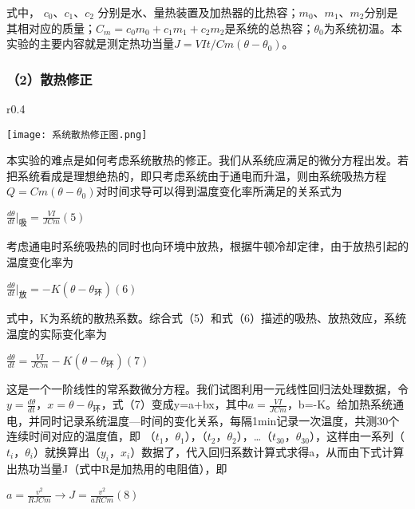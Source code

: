 \documentclass[11pt,a4paper,oneside]{article}
\begin{document}
式中， $c_0$、$c_1$、$c_2$ 分别是水、量热装置及加热器的比热容；$m_0$、$m_1$、$m_2$分别是其相对应的质量；${C_m}={c_0}{m_0}+{c_1}{m_1}+{c_2}{m_2}$是系统的总热容；${\theta}_0$为系统初温。本实验的主要内容就是测定热功当量$J=VIt/Cm(\theta-\theta_{0})$。
\subsubsection*{（2）散热修正}

\begin{wrapfigure}{r}{0.4\textwidth}
  \vspace{-20pt}
  \begin{center}
    \texttt{[image: 系统散热修正图.png]}
  \end{center}
  \vspace{-20pt}
  \vspace{-10pt}
\end{wrapfigure}

	本实验的难点是如何考虑系统散热的修正。我们从系统应满足的微分方程出发。若把系统看成是理想绝热的，即只考虑系统由于通电而升温，则由系统吸热方程$Q=Cm(\theta-{\theta}_0)$对时间求导可以得到温度变化率所满足的关系式为\\
\begin{center}
$\displaystyle\frac{d\theta}{dt} |_{\text{吸}}=\displaystyle\frac{VI}{JCm}     (5)$
\end{center}
	考虑通电时系统吸热的同时也向环境中放热，根据牛顿冷却定律，由于放热引起的温度变化率为
	\begin{center}
$\displaystyle\frac{d\theta}{dt} |_{\text{放}}=-K(\theta-\theta_{\text{环}})     (6)$
	\end{center}

式中，K为系统的散热系数。综合式（5）和式（6）描述的吸热、放热效应，系统温度的实际变化率为
\begin{center}
$\displaystyle\frac{d\theta}{dt}=\displaystyle\frac{VI}{JCm}-K(\theta - \theta_{\text{环}})    (7)$
\end{center}
这是一个一阶线性的常系数微分方程。我们试图利用一元线性回归法处理数据，令$y=\frac{d\theta}{dt}$，$x=\theta-\theta_{\text{环}} $，式（7）变成y=a+bx，其中$a=\frac{VI}{JCm}$，b=-K。给加热系统通电，并同时记录系统温度—时间的变化关系，每隔1min记录一次温度，共测30个连续时间对应的温度值，即
（$t_1$，${\theta}_1$），（$t_2$，${\theta}_2$），…（$t_30$，${\theta}_30$），这样由一系列（$t_i$，$\theta_i$）就换算出（$y_i$，$x_i$）数据了，代入回归系数计算式求得a，从而由下式计算出热功当量J（式中R是加热用的电阻值），即
\begin{center}
$a=\displaystyle\frac{v^{2}}{RJCm}\rightarrow J=\displaystyle\frac{v^{2}}{aRCm}     (8)$
\end{center}
\end{document}
